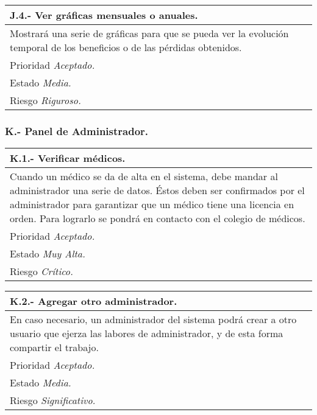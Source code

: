 	\begin{center}
	\begin{tabulary}{15cm}{|L|}
		\hline
			\bf{J.4.- Ver gráficas mensuales o anuales.} \\
		\hline
			Mostrará una serie de gráficas para que se pueda ver la evolución temporal de los beneficios o de las pérdidas obtenidos. \\
		\hline
			Prioridad \textit{Aceptado.} \\
		\hline
			Estado \textit{Media.} \\
		\hline
			Riesgo \textit{Riguroso.} \\
		\hline
	\end{tabulary}
	\end{center}

	\subsubsection{K.- Panel de Administrador.}

	\begin{center}
	\begin{tabulary}{15cm}{|L|}
		\hline
			\bf{K.1.- Verificar médicos.} \\
		\hline
			Cuando un médico se da de alta en el sistema, debe mandar al administrador una serie de datos. Éstos deben ser confirmados por el administrador para garantizar que un médico tiene una licencia en orden. Para lograrlo se pondrá en contacto con el colegio de médicos. \\
		\hline
			Prioridad \textit{Aceptado.} \\
		\hline
			Estado \textit{Muy Alta.} \\
		\hline
			Riesgo \textit{Crítico.} \\
		\hline
	\end{tabulary}
	\end{center}

	\begin{center}
	\begin{tabulary}{15cm}{|L|}
		\hline
			\bf{K.2.- Agregar otro administrador.} \\
		\hline
			En caso necesario, un administrador del sistema podrá crear a otro usuario que ejerza las labores de administrador, y de esta forma compartir el trabajo. \\
		\hline
			Prioridad \textit{Aceptado.} \\
		\hline
			Estado \textit{Media.} \\
		\hline
			Riesgo \textit{Significativo.} \\
		\hline
	\end{tabulary}
	\end{center}

